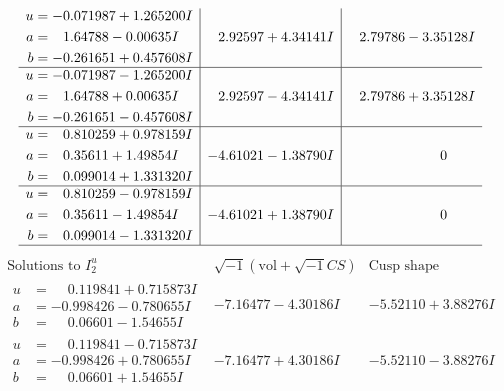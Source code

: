 \documentclass[1p]{elsarticle_modified}
\theoremstyle{definition}
\newcommand{\I}{\sqrt{-1}}
\begin{document}
$$\begin{array}{c|c|c}
\begin{aligned}
u &= -0.071987 + 1.265200 I \\
a &= \phantom{-}1.64788 - 0.00635 I \\
b &= -0.261651 + 0.457608 I\end{aligned}
 & \phantom{-}2.92597 + 4.34141 I & \phantom{-}2.79786 - 3.35128 I \\ \hline\begin{aligned}
u &= -0.071987 - 1.265200 I \\
a &= \phantom{-}1.64788 + 0.00635 I \\
b &= -0.261651 - 0.457608 I\end{aligned}
 & \phantom{-}2.92597 - 4.34141 I & \phantom{-}2.79786 + 3.35128 I \\ \hline\begin{aligned}
u &= \phantom{-}0.810259 + 0.978159 I \\
a &= \phantom{-}0.35611 + 1.49854 I \\
b &= \phantom{-}0.099014 + 1.331320 I\end{aligned}
 & -4.61021 - 1.38790 I & \phantom{-0.000000 } 0 \\ \hline\begin{aligned}
u &= \phantom{-}0.810259 - 0.978159 I \\
a &= \phantom{-}0.35611 - 1.49854 I \\
b &= \phantom{-}0.099014 - 1.331320 I\end{aligned}
 & -4.61021 + 1.38790 I & \phantom{-0.000000 } 0\\
 \hline 
 \end{array}$$\newpage$$\begin{array}{c|c|c}  
\text{Solutions to }I^u_{2}& \I (\text{vol} + \sqrt{-1}CS) & \text{Cusp shape}\\
 \hline 
\begin{aligned}
u &= \phantom{-}0.119841 + 0.715873 I \\
a &= -0.998426 - 0.780655 I \\
b &= \phantom{-}0.06601 - 1.54655 I\end{aligned}
 & -7.16477 - 4.30186 I & -5.52110 + 3.88276 I \\ \hline\begin{aligned}
u &= \phantom{-}0.119841 - 0.715873 I \\
a &= -0.998426 + 0.780655 I \\
b &= \phantom{-}0.06601 + 1.54655 I\end{aligned}
 & -7.16477 + 4.30186 I & -5.52110 - 3.88276 I \\ \hline\begin{aligned}

\end{aligned}
\end{array}$$
\end{document}
